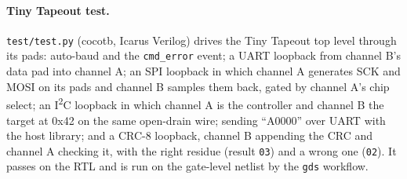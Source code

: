 \documentclass[11pt,a4paper]{article}
\newcommand{\sig}[1]{\texttt{#1}}
\begin{document}
\paragraph{Tiny Tapeout test.} \sig{test/test.py} (cocotb, Icarus Verilog) drives the Tiny Tapeout top level through its pads: auto-baud and the \sig{cmd\_error} event; a UART loopback from channel B's data pad into channel A; an SPI loopback in which channel A generates SCK and MOSI on its pads and channel B samples them back, gated by channel A's chip select; an I\textsuperscript{2}C loopback in which channel A is the controller and channel B the target at 0x42 on the same open-drain wire; sending ``A0000'' over UART with the host library; and a CRC-8 loopback, channel B appending the CRC and channel A checking it, with the right residue (result \texttt{03}) and a wrong one (\texttt{02}). It passes on the RTL and is run on the gate-level netlist by the \sig{gds} workflow.
\end{document}

